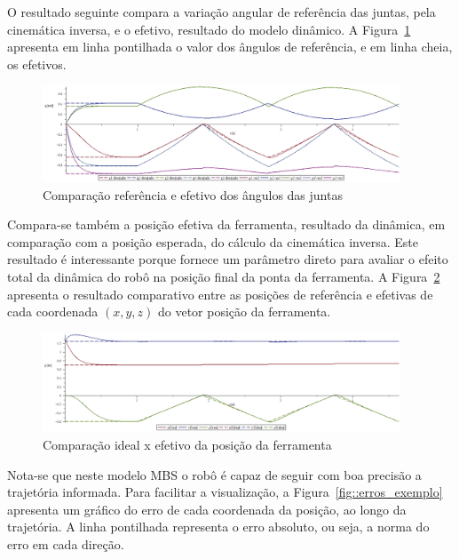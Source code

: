 O resultado seguinte compara a variação angular de referência das juntas, pela
cinemática inversa, e o efetivo, resultado do modelo dinâmico.
A Figura~\ref{fig::qxt_ex_realxideal} apresenta em linha pontilhada o valor dos
ângulos de referência, e em linha cheia, os efetivos.

\begin{figure}[h]
	\centering 
 	\includegraphics[width=0.95\textwidth]{figs/qxt_ex_realxideal}
 	\caption{Comparação referência e efetivo dos ângulos das juntas}
 	\label{fig::qxt_ex_realxideal}
\end{figure}

Compara-se também a posição efetiva da ferramenta, resultado da dinâmica, em
comparação com a posição esperada, do cálculo da cinemática inversa. Este
resultado é interessante porque fornece um parâmetro direto para avaliar o
efeito total da dinâmica do robô na posição final da ponta da ferramenta.
A Figura~\ref{fig::errop_exemplo} apresenta o resultado comparativo entre as
posições de referência e efetivas de cada coordenada $(x, y, z)$ do vetor
posição da ferramenta.

\begin{figure}[h]
	\centering 
 	\includegraphics[width=0.95\textwidth]{figs/errop_exemplo}
 	\caption{Comparação ideal x efetivo da posição da ferramenta}
 	\label{fig::errop_exemplo}
\end{figure}

Nota-se que neste modelo MBS o robô é capaz de seguir com boa precisão a
trajetória informada. Para facilitar a visualização, a
Figura~\ref{fig::erros_exemplo} apresenta um gráfico do erro de cada coordenada
da posição, ao longo da trajetória. A linha pontilhada representa o erro
absoluto, ou seja, a norma do erro em cada direção.


